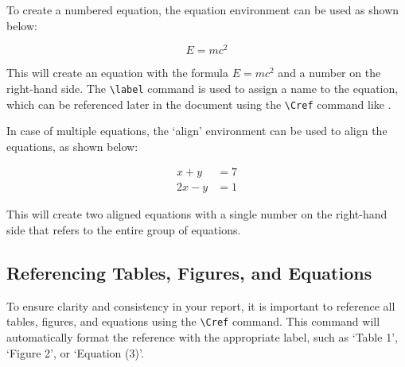 \documentclass{article}
\begin{document}
To create a numbered equation, the equation environment can be used as shown below:

\begin{equation}
  E = mc^2
  \label{eq:mass-energy}
\end{equation}

This will create an equation with the formula $E = mc^2$ and a number on the right-hand side. The \verb+\label+ command is used to assign a name to the equation, which can be referenced later in the document using the \verb+\Cref+ command like .



In case of multiple equations, the `align' environment can be used to align the equations, as shown below:

\begin{align}
  x + y &= 7  \nonumber \\ 
  2x - y &= 1
\end{align}


This will create two aligned equations with a single number on the right-hand side that refers to the entire group of equations.


\subsection{Referencing Tables, Figures, and Equations}

To ensure clarity and consistency in your report, it is important to reference all tables, figures, and equations using the \verb+\Cref+ command. This command will automatically format the reference with the appropriate label, such as `Table 1', `Figure 2',  or `Equation (3)'.







\end{document}

